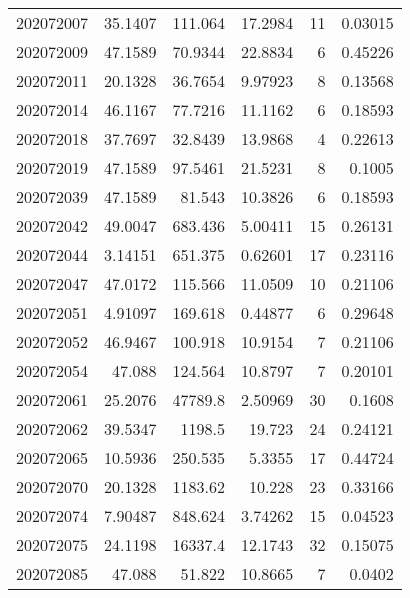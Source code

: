 \begin{tabular}{rrrrrr}
 202072007 &         35.1407  &      111.064  &           17.2984  &          11 & 0.03015 \\
 202072009 &         47.1589  &       70.9344 &           22.8834  &           6 & 0.45226 \\
 202072011 &         20.1328  &       36.7654 &            9.97923 &           8 & 0.13568 \\
 202072014 &         46.1167  &       77.7216 &           11.1162  &           6 & 0.18593 \\
 202072018 &         37.7697  &       32.8439 &           13.9868  &           4 & 0.22613 \\
 202072019 &         47.1589  &       97.5461 &           21.5231  &           8 & 0.1005  \\
 202072039 &         47.1589  &       81.543  &           10.3826  &           6 & 0.18593 \\
 202072042 &         49.0047  &      683.436  &            5.00411 &          15 & 0.26131 \\
 202072044 &          3.14151 &      651.375  &            0.62601 &          17 & 0.23116 \\
 202072047 &         47.0172  &      115.566  &           11.0509  &          10 & 0.21106 \\
 202072051 &          4.91097 &      169.618  &            0.44877 &           6 & 0.29648 \\
 202072052 &         46.9467  &      100.918  &           10.9154  &           7 & 0.21106 \\
 202072054 &         47.088   &      124.564  &           10.8797  &           7 & 0.20101 \\
 202072061 &         25.2076  &    47789.8    &            2.50969 &          30 & 0.1608  \\
 202072062 &         39.5347  &     1198.5    &           19.723   &          24 & 0.24121 \\
 202072065 &         10.5936  &      250.535  &            5.3355  &          17 & 0.44724 \\
 202072070 &         20.1328  &     1183.62   &           10.228   &          23 & 0.33166 \\
 202072074 &          7.90487 &      848.624  &            3.74262 &          15 & 0.04523 \\
 202072075 &         24.1198  &    16337.4    &           12.1743  &          32 & 0.15075 \\
 202072085 &         47.088   &       51.822  &           10.8665  &           7 & 0.0402  \\

\end{tabular}
